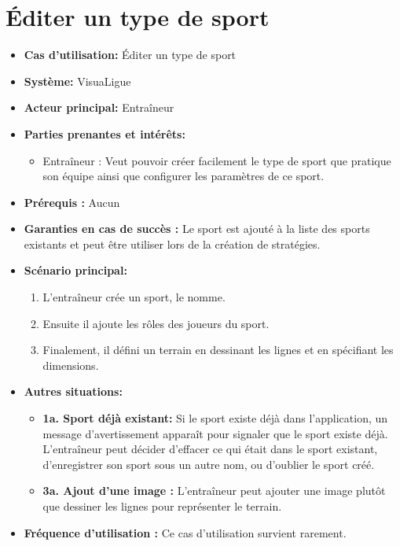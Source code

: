 \section{Éditer un type de sport}
\label{sec:ajouter_un_type_de_sport}

\begin{itemize}
    \item \textbf{Cas d'utilisation:} Éditer un type de sport
    \item \textbf{Syst\`eme:} VisuaLigue
    \item \textbf{Acteur principal:} Entra\^ineur
    \item \textbf{Parties prenantes et int\'er\^ets:}
    	\begin{itemize}
    		\item Entraîneur : Veut pouvoir cr\'eer facilement le type de sport que pratique son équipe ainsi que configurer les paramètres de ce sport. 
    	\end{itemize}
    \item \textbf{Pr\'erequis :} Aucun
    \item \textbf{Garanties en cas de succ\`es :} Le sport est ajout\'e \`a la liste des sports existants et peut \^etre utiliser lors de la cr\'eation de strat\'egies.
    \item \textbf{Sc\'enario principal:}
        \begin{enumerate}
            \item L'entra\^ineur cr\'ee un sport, le nomme.
            \item Ensuite il ajoute les r\^oles des joueurs du sport.
            \item Finalement, il d\'efini un terrain en dessinant les lignes et en sp\'ecifiant les dimensions.
        \end{enumerate}
    \item \textbf{Autres situations:}
    \begin{itemize}
        \item \textbf{1a. Sport d\'ej\`a existant:} Si le sport existe d\'ej\`a dans l'application, un message d'avertissement appara\^it pour signaler que le sport existe d\'ej\`a.
        L'entraîneur peut d\'ecider d'effacer ce qui \'etait dans le sport existant, d'enregistrer son sport sous un autre nom, ou d'oublier le sport cr\'e\'e.
        \item \textbf{3a. Ajout d'une image :} L'entraîneur peut ajouter une image plutôt que dessiner les lignes pour représenter le terrain.
    \end{itemize}
    \item \textbf{Fréquence d'utilisation :} Ce cas d'utilisation survient rarement.
\end{itemize}



